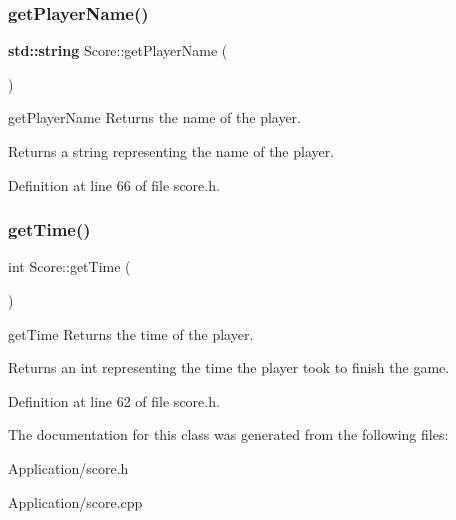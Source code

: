 \subsubsection{\texorpdfstring{get\+Player\+Name()}{getPlayerName()}}
{\footnotesize\ttfamily \textbf{ std\+::string} Score\+::get\+Player\+Name (\begin{DoxyParamCaption}{ }\end{DoxyParamCaption})\hspace{0.3cm}{\ttfamily [inline]}}



get\+Player\+Name Returns the name of the player. 

\begin{DoxyReturn}{Returns}
a string representing the name of the player. 
\end{DoxyReturn}


Definition at line 66 of file score.\+h.

\mbox{\label{class_score_a4976c3ddaf76725c3f37c0cec3dfeef6}} 
\subsubsection{\texorpdfstring{get\+Time()}{getTime()}}
{\footnotesize\ttfamily int Score\+::get\+Time (\begin{DoxyParamCaption}{ }\end{DoxyParamCaption})\hspace{0.3cm}{\ttfamily [inline]}}



get\+Time Returns the time of the player. 

\begin{DoxyReturn}{Returns}
an int representing the time the player took to finish the game. 
\end{DoxyReturn}


Definition at line 62 of file score.\+h.



The documentation for this class was generated from the following files\+:\begin{DoxyCompactItemize}
\item 
Application/score.\+h\item 
Application/score.\+cpp\end{DoxyCompactItemize}
